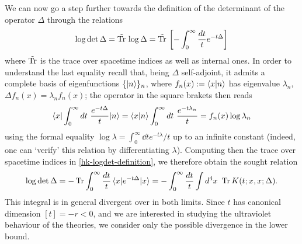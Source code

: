 We can now go a step further towards the definition of the determinant of the operator \( \Delta \) through the relations
\begin{equation}\label{hk-logdet-definition}
\log \det  \Delta = \tilde{\operatorname{Tr}}\, \log  \Delta  = \tilde{\operatorname{Tr}}\,\left[ - \int_0^\infty \frac{dt}{t} e^{- t \Delta} \right]
\end{equation}
where $\tilde {\operatorname{Tr}}$  is the trace over spacetime indices as well as internal ones.
In order to understand the last equality recall that, being $\Delta$ self-adjoint, it admits a complete basis of eigenfunctions $\{\ket{n}\}_n$, where $f_n(x) := \braket{x |n}$ has eigenvalue $\lambda_n$, \ie
\(
\Delta f_n(x) = \lambda_n f_n(x)
\); the operator in the square brakets then reads
\begin{equation}
\braket{x | \int_0^\infty dt\  \frac{e^{-t \Delta }}{t} | n } =
\braket{x  | n }\int_0^\infty dt\  \frac{e^{-t \lambda_n }}{t}  
=f_n(x) \log \lambda_n
\end{equation}
using the formal equality $\log \lambda = \int_0^\infty \dd{t} {e^{-t \lambda }}/{t}  $ up to an  infinite constant (indeed, one can `verify' this relation by differentiating $\lambda$).
Computing then the trace over spacetime indices in \eqref{hk-logdet-definition}, we therefore obtain the sought relation
\begin{equation}
\log \det  \Delta =   - \operatorname{Tr}   \int_0^\infty \frac{dt}{t} \braket{x | e^{- t \Delta} | x} = -   \int_0^\infty \frac{dt}{t} \int d^4x\ \operatorname{Tr}  K(t;x,x;\Delta).
\end{equation}
This integral is in general divergent over in both limits. Since  $t$ has canonical dimension $ [t] = - r < 0$, and we are interested in studying the ultraviolet behaviour of the theories, we consider only the possible divergence in the lower bound.

